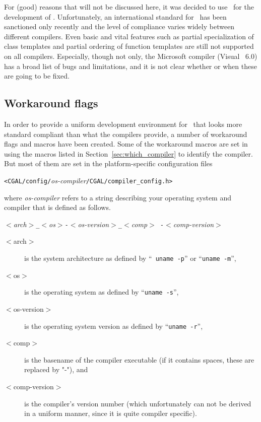 For (good) reasons that will not be discussed here, it was decided to
use \CC\ for the development of \cgal. Unfortunately, an international
standard for \CC\ has been sanctioned only recently
\cite{ansi-is14882pl98} and the level of compliance varies widely
between different compilers. 
Even basic and vital features such as
partial specialization of class templates and partial ordering of
function templates are still not supported on all compilers.
Especially, though not only, the Microsoft compiler (Visual \CC\ 6.0)
has a broad list of bugs and limitations, and it is not clear whether
or when these are going to be fixed.

\subsection{Workaround flags}
\label{sec:workaround_flags}

In order to provide a uniform development environment for \cgal\ that
looks more standard compliant than what the compilers provide, a number
of workaround flags and macros have been created.  Some of the
workaround macros are set in 
using the macros 
listed in Section~\ref{sec:which_compiler} to identify the compiler. 
But most of them are set in the platform-specific configuration files
\begin{center}
\texttt{<CGAL/config/}{\em os-compiler}\texttt{/CGAL/compiler\_config.h>}
\end{center}
where \textit{os-compiler} refers to a string describing your
operating system and compiler that is defined as follows.

\begin{center}
  \textit{$<$arch$>$\texttt{\_}$<$os$>$\texttt{-}$<$os-version$>$\texttt{\_}$<$comp$>${\tt
      -}$<$comp-version$>$}
\end{center}

\begin{description}
\item[$<$arch$>$] is the system architecture as defined by ``{\tt
    uname -p}'' or ``\texttt{uname -m}'',
\item[$<$os$>$] is the operating system as defined by ``\texttt{uname
    -s}'',
\item[$<$os-version$>$] is the operating system version as defined by
  ``\texttt{uname -r}'',
\item[$<$comp$>$] is the basename of the compiler executable (if it
  contains spaces, these are replaced by "-"), and
\item[$<$comp-version$>$] is the compiler's version number (which
  unfortunately can not be derived in a uniform manner, since it is
  quite compiler specific).
\end{description}

